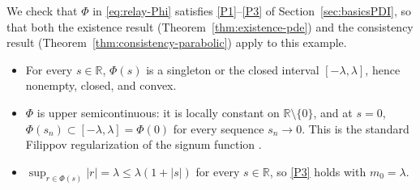 \documentclass[11pt]{elsarticle}
\theoremstyle{definition}
\theoremstyle{remark}
\numberwithin{equation}{section}
\begin{document}
We check that $\Phi$ in \eqref{eq:relay-Phi} satisfies \ref{P1}--\ref{P3} of
Section~\ref{sec:basicsPDI}, so that both the existence result
(Theorem~\ref{thm:existence-pde}) and the consistency result
(Theorem~\ref{thm:consistency-parabolic}) apply to this example.
\begin{itemize}
	\item[(P1)] For every $s\in\mathbb{R}$, $\Phi(s)$ is a singleton or the
	closed interval $[-\lambda,\lambda]$, hence nonempty, closed, and convex.
	\item[(P2)] $\Phi$ is upper semicontinuous: it is locally constant on
	$\mathbb{R}\setminus\{0\}$, and at $s=0$, $\Phi(s_n)\subset[-\lambda,\lambda]=\Phi(0)$
	for every sequence $s_n\to0$. This is the standard Filippov
	regularization of the signum function \cite{Filippov1988}.
	\item[(P3)] $\sup_{r\in\Phi(s)}|r| = \lambda \le \lambda(1+|s|)$ for every
	$s\in\mathbb{R}$, so \ref{P3} holds with $m_0=\lambda$.
\end{itemize}
\end{document}
